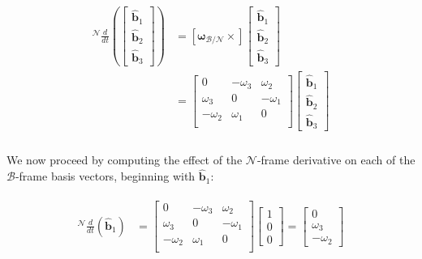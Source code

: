 \documentclass[
]{article}
\begin{document}
\[\begin{aligned}
\begin{aligned}
    {}^\mathcal{N}\frac{d}{dt}\left(
        \begin{bmatrix}
            \hat{\boldsymbol{b}}_1 \\ \hat{\boldsymbol{b}}_2 \\ \hat{\boldsymbol{b}}_3
        \end{bmatrix}
    \right) &= [\boldsymbol{\omega}_\mathcal{B/N}\times]
        \begin{bmatrix}
            \hat{\boldsymbol{b}}_1 \\ \hat{\boldsymbol{b}}_2 \\ \hat{\boldsymbol{b}}_3
        \end{bmatrix} \\
        &= \begin{bmatrix}
            0 & -\omega_3 & \omega_2 \\
            \omega_3 & 0 & -\omega_1 \\
            -\omega_2 & \omega_1 & 0 \\
        \end{bmatrix}
        \begin{bmatrix}
            \hat{\boldsymbol{b}}_1 \\ \hat{\boldsymbol{b}}_2 \\ \hat{\boldsymbol{b}}_3
        \end{bmatrix} \\
\end{aligned}
\end{aligned}\]

We now proceed by computing the effect of the \(\mathcal{N}\)-frame
derivative on each of the \(\mathcal{B}\)-frame basis vectors, beginning
with \(\hat{\boldsymbol{b}}_1\):

\[\begin{aligned}
\begin{aligned}
    {}^\mathcal{N}\frac{d}{dt}\left(\hat{\boldsymbol{b}}_1\right) &= \begin{bmatrix}
            0 & -\omega_3 & \omega_2 \\
            \omega_3 & 0 & -\omega_1 \\
            -\omega_2 & \omega_1 & 0 \\
        \end{bmatrix}
        \begin{bmatrix}
            1 \\ 0 \\ 0
        \end{bmatrix} = \begin{bmatrix}
            0 \\ \omega_3 \\ -\omega_2
        \end{bmatrix} \\
\end{aligned}
\end{aligned}\]
\end{document}
